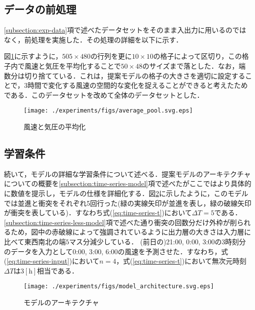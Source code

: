 
\subsection{データの前処理 \label{subsection:exp-data-preprocessing}}
\ref{subsection:exp-data}項で述べたデータセットをそのまま入出力に用いるのではなく，前処理を実施した．その処理の詳細を以下に示す．

図\ref{fig:exp-averaging}に示すように，$505 \times 480$の行列を更に$10 \times 10$の格子によって区切り，この格子内で風速と気圧を平均化することで$50 \times 48$のサイズまで落とした．なお，端数分は切り捨てている．これは，提案モデルの格子の大きさを適切に設定することで，3時間で変化する風速の空間的な変化を捉えることができると考えたためである．このデータセットを改めて全体のデータセットとした．%

\begin{figure}[bp]
  \centering
  \texttt{[image: ./experiments/figs/average\_pool.svg.eps]}
  \caption{風速と気圧の平均化}
  \label{fig:exp-averaging}
\end{figure}


\subsection{学習条件 \label{subsection:exp-condition}}

続いて，モデルの詳細な学習条件について述べる．提案モデルのアーキテクチャについての概要を\ref{subsection:time-series-model}項で述べたがここではより具体的に数値を提示し，モデルの仕様を詳細化する．図\ref{fig:exp-model-architecture}に示したように，このモデルでは並進と衝突をそれぞれ5回行った(緑の実線矢印が並進を表し，緑の破線矢印が衝突を表している)．すなわち式(\ref{eq:time-series-t})において$\Delta T = 5$である．\ref{subsection:time-series-less-model}項で述べた通り衝突の回数分だけ外枠が削られるため，図中の赤破線によって強調されているように出力層の大きさは入力層に比べて東西南北の端$5$マス分減少している．
(前日の)21:00, 0:00, 3:00の3時刻分のデータを入力として0:00, 3:00, 6:00の風速を予測させた．すなわち，式(\ref{eq:time-series-input})において$n=4$，式(\ref{eq:time-series-t})において無次元時刻$\Delta T$は$3[\mathrm{h}]$相当である．

\begin{figure}[bp]
  \centering
  \texttt{[image: ./experiments/figs/model\_architecture.svg.eps]}
  \caption{モデルのアーキテクチャ}
  \label{fig:exp-model-architecture}
\end{figure}

